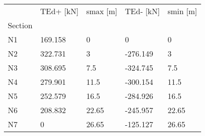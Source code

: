 \documentclass{standalone}
\begin{document}
\begin{tabular}{lllll}
\toprule

 & TEd+ [kN] & smax [m] & TEd- [kN] & smin [m] \\
Section &           &          &           &          \\
\midrule
N1      &   169.158 &        0 &         0 &        0 \\
N2      &   322.731 &        3 &  -276.149 &        3 \\
N3      &   308.695 &      7.5 &  -324.745 &      7.5 \\
N4      &   279.901 &     11.5 &  -300.154 &     11.5 \\
N5      &   252.579 &     16.5 &  -284.926 &     16.5 \\
N6      &   208.832 &    22.65 &  -245.957 &    22.65 \\
N7      &         0 &    26.65 &  -125.127 &    26.65 \\
\bottomrule
\end{tabular}
\end{document}
